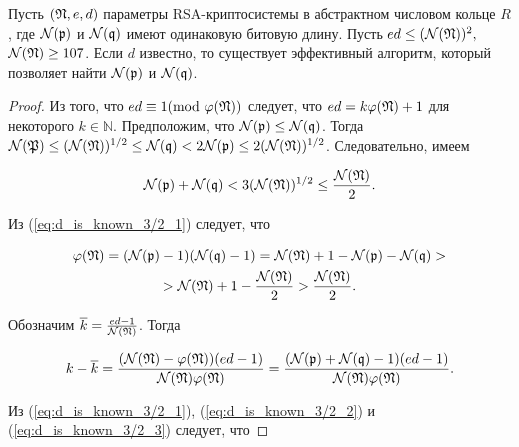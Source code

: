\documentclass[_00_dissertation.tex]{subfiles}
\begin{document}
\begin{theorem}\label{thm:d_is_known_2}
    Пусть $(\mathfrak{N}, e, d)$ параметры RSA-криптосистемы в абстрактном числовом кольце $R$, где $\mathcal{N}(\mathfrak{p})$ и $\mathcal{N}(\mathfrak{q})$ имеют одинаковую битовую длину.
    Пусть $ed \le (\mathcal{N}(\mathfrak{N}))^2,$ $\mathcal{N}(\mathfrak{N}) \ge 107$.
    Если $d$ известно, то существует эффективный алгоритм, который позволяет найти $\mathcal{N}(\mathfrak{p})$ и $\mathcal{N}(\mathfrak{q})$.
\end{theorem}
\begin{proof}
    Из того, что $ed\equiv 1(\textrm{mod }\varphi(\mathfrak{N}))$ следует, что $ed=k\varphi(\mathfrak{N})+1$ для некоторого $k\in\mathbb{N}$.
    Предположим, что $\mathcal{N}(\mathfrak{p}) \le \mathcal{N}(\mathfrak{q})$.
    Тогда $\mathcal{N}(\mathfrak{P}) \le (\mathcal{N}(\mathfrak{N}))^{1/2} \le \mathcal{N}(\mathfrak{q}) < 2\mathcal{N}(\mathfrak{p}) \le 2(\mathcal{N}(\mathfrak{N}))^{1/2}$.
    Следовательно, имеем

    \begin{equation}\label{eq:d_is_known_3/2_1}
        \mathcal{N}(\mathfrak{p})+\mathcal{N}(\mathfrak{q}) < 3(\mathcal{N}(\mathfrak{N}))^{1/2} \le \frac{\mathcal{N}(\mathfrak{N})}{2}.
    \end{equation}

    Из (\ref{eq:d_is_known_3/2_1}) следует, что

    \begin{multline}\label{eq:d_is_known_3/2_2}
        \varphi(\mathfrak{N}) =
        (\mathcal{N}(\mathfrak{p})-1)(\mathcal{N}(\mathfrak{q})-1) =
        \mathcal{N}(\mathfrak{N}) + 1 - \mathcal{N}(\mathfrak{p}) - \mathcal{N}(\mathfrak{q}) >\\
        > \mathcal{N}(\mathfrak{N}) + 1 - \frac{\mathcal{N}(\mathfrak{N})}{2} >
        \frac{\mathcal{N}(\mathfrak{N})}{2}.
    \end{multline}

    Обозначим $\overline{k} = \frac{ed-1}{\mathcal{N}(\mathfrak{N})}$.
    Тогда

    \begin{equation}\label{eq:d_is_known_3/2_3}
        k-\overline{k} =
        \frac{(\mathcal{N}(\mathfrak{N})-\varphi(\mathfrak{N}))(ed-1)}{\mathcal{N}(\mathfrak{N})\varphi(\mathfrak{N})} =
        \frac{(\mathcal{N}(\mathfrak{p})+\mathcal{N}(\mathfrak{q})-1)(ed-1)}{\mathcal{N}(\mathfrak{N})\varphi(\mathfrak{N})}.
    \end{equation}
  
    Из (\ref{eq:d_is_known_3/2_1}), (\ref{eq:d_is_known_3/2_2}) и (\ref{eq:d_is_known_3/2_3}) следует, что


\end{proof}
\end{document}
